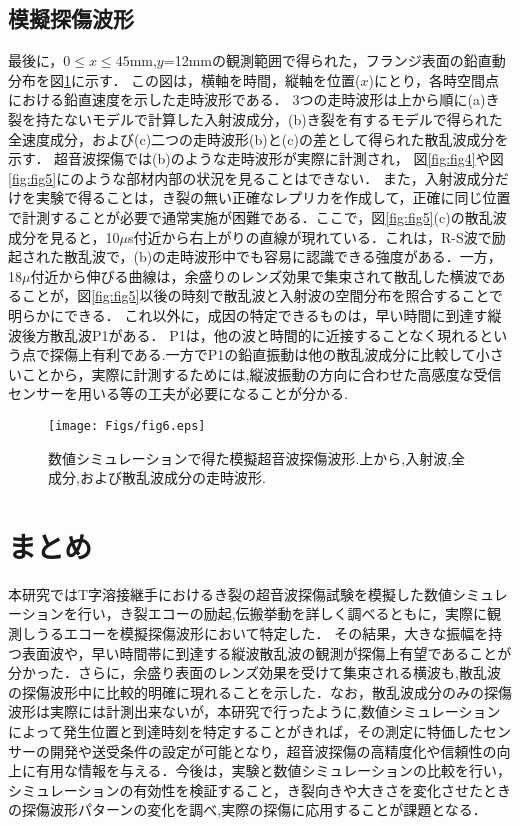 \documentclass{jsce}
\begin{document}
\subsection{模擬探傷波形}
最後に，$0\leq x\leq 45$mm,$y$=12mmの観測範囲で得られた，フランジ表面の鉛直動分布を図\ref{fig:fig6}に示す．
この図は，横軸を時間，縦軸を位置($x$)にとり，各時空間点における鉛直速度を示した走時波形である．
3つの走時波形は上から順に(a)き裂を持たないモデルで計算した入射波成分，(b)き裂を有するモデルで得られた全速度成分，および(c)二つの走時波形(b)と(c)の差として得られた散乱波成分を示す．
超音波探傷では(b)のような走時波形が実際に計測され，
図\ref{fig:fig4}や図\ref{fig:fig5}にのような部材内部の状況を見ることはできない．
また，入射波成分だけを実験で得ることは，き裂の無い正確なレプリカを作成して，正確に同じ位置で計測することが必要で通常実施が困難である．ここで，図\ref{fig:fig5}(c)の散乱波成分を見ると，10$\mu$s付近から右上がりの直線が現れている．これは，R-S波で励起された散乱波で，(b)の走時波形中でも容易に認識できる強度がある．一方，18$\mu$付近から伸びる曲線は，余盛りのレンズ効果で集束されて散乱した横波であることが，図\ref{fig:fig5}以後の時刻で散乱波と入射波の空間分布を照合することで明らかにできる．
これ以外に，成因の特定できるものは，早い時間に到達す縦波後方散乱波P1がある．
P1は，他の波と時間的に近接することなく現れるという点で探傷上有利である.一方でP1の鉛直振動は他の散乱波成分に比較して小さいことから，実際に計測するためには,縦波振動の方向に合わせた高感度な受信センサーを用いる等の工夫が必要になることが分かる.
\begin{figure}[h]
	\begin{center}
	\texttt{[image: Figs/fig6.eps]} 
	\end{center}
	\caption{
		数値シミュレーションで得た模擬超音波探傷波形.上から,入射波,全成分,および散乱波成分の走時波形.
	} 
	\label{fig:fig6}
\end{figure}
\section{まとめ}
本研究ではT字溶接継手におけるき裂の超音波探傷試験を模擬した数値シミュレーションを行い，き裂エコーの励起,伝搬挙動を詳しく調べるともに，実際に観測しうるエコーを模擬探傷波形において特定した．
その結果，大きな振幅を持つ表面波や，早い時間帯に到達する縦波散乱波の観測が探傷上有望であることが分かった．さらに，余盛り表面のレンズ効果を受けて集束される横波も,散乱波の探傷波形中に比較的明確に現れることを示した．なお，散乱波成分のみの探傷波形は実際には計測出来ないが，本研究で行ったように,数値シミュレーションによって発生位置と到達時刻を特定することがきれば，その測定に特価したセンサーの開発や送受条件の設定が可能となり，超音波探傷の高精度化や信頼性の向上に有用な情報を与える．今後は，実験と数値シミュレーションの比較を行い，シミュレーションの有効性を検証すること，き裂向きや大きさを変化させたときの探傷波形パターンの変化を調べ,実際の探傷に応用することが課題となる．
\end{document}

